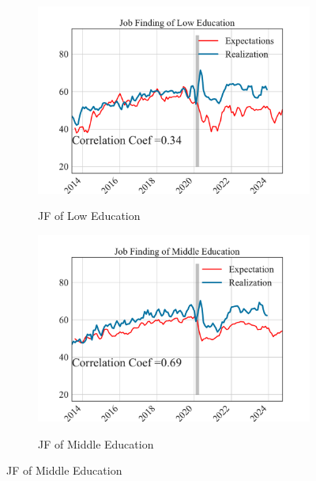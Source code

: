 \begin{figure}[pt] 
    \centering  
    \caption{Perceived versus realized job transitions: by education} 
    \label{fig:simple_comparison_by_educ}

    \begin{subfigure}{0.32\linewidth}
        \centering
        \caption{JF of Low Education}
        \includegraphics[width=\linewidth]{text/chapter2/Figures/expectation_realization_comparison_JF_LowEdu.pdf}  
        \label{fig:subfig1}
    \end{subfigure}
    \begin{subfigure}{0.32\linewidth}
        \centering
        \caption{JF of Middle Education}
        \includegraphics[width=\linewidth]{text/chapter2/Figures/expectation_realization_comparison_JF_MidEdu.pdf} 
        \label{fig:subfig2}
    \end{subfigure}

\end{figure}
